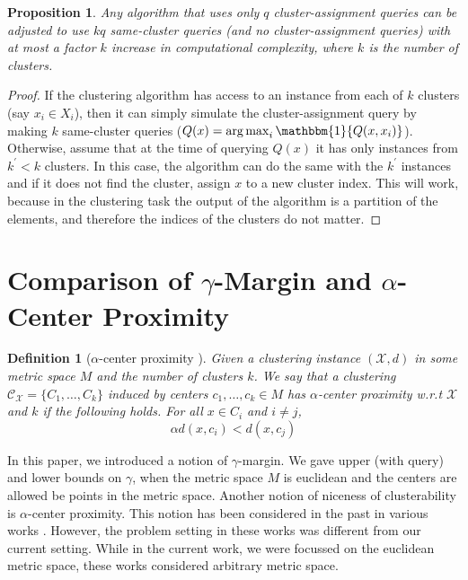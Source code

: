 \documentclass{article}
\newcommand{\mc}{\mathcal}
\DeclareMathOperator*{\argmax}{arg\,max}
\newtheorem{definition}[theorem]{Definition}
\newtheorem{proposition}[theorem]{Proposition}
\begin{document}
\begin{proposition}
Any algorithm that uses only $q$ cluster-assignment queries can be adjusted to use $kq$ same-cluster queries (and no cluster-assignment queries) with at most a factor $k$ increase in computational complexity, where $k$ is the number of clusters.
\end{proposition}
\begin{proof}
If the clustering algorithm has access to an instance from each of $k$ clusters (say $x_i\in X_i$), then it can simply simulate the cluster-assignment query by making $k$ same-cluster queries ($Q(x) = \argmax_{i}\mathbbm{1}\{Q(x, x_i)\}$). Otherwise, assume that at the time of querying $Q(x)$ it has only instances from $k^\prime<k$ clusters. In this case, the algorithm can do the same with the $k^\prime$ instances and if it does not find the cluster, assign $x$ to a new cluster index. This will work, because in the clustering task the output of the algorithm is a partition of the elements, and therefore the indices of the clusters do not matter.
\end{proof}


\section{Comparison of $\gamma$-Margin and $\alpha$-Center Proximity}
\label{appendix:gammaMrginVsAlphaCenter}

\begin{definition}[$\alpha$-center proximity \cite{awasthi2012center}]
\label{defn:alphacp}
Given a clustering instance $(\mc X, d)$ in some metric space $M$ and the number of clusters $k$. We say that a clustering $\mc C_{\mc X} = \{C_1, \ldots, C_k\}$ induced by centers $c_1, \ldots, c_k \in M$ has $\alpha$-center proximity w.r.t $\mc X$ and $k$ if the following holds. For all $x \in C_i$ and $i\neq j$, 
$$\alpha d(x, c_i) < d(x, c_j)$$
\end{definition}
In this paper, we introduced a notion of $\gamma$-margin. We gave upper (with query) and lower bounds on $\gamma$, when the metric space $M$ is euclidean and the centers are allowed be points in the metric space. Another notion of niceness of clusterability is $\alpha$-center proximity. This notion has been considered in the past in various works \cite{balcan2012clustering,awasthi2012center}. However, the problem setting in these works was different from our current setting. While in the current work, we were focussed on the euclidean metric space, these works considered arbitrary metric space. 
\end{document}
